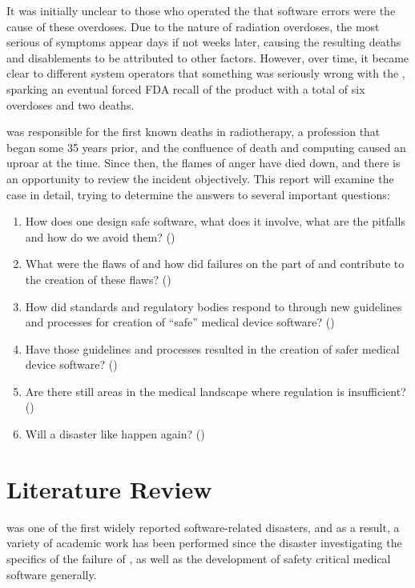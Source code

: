 \documentclass{cshonours}
\begin{document}
It was initially unclear to those who operated the \ther that software errors were the cause of these overdoses. Due to the nature of radiation overdoses, the most serious of symptoms appear days if not weeks later, causing the resulting deaths and disablements to be attributed to other factors. However, over time, it became clear to different system operators that something was seriously wrong with the \ther, sparking an eventual forced FDA recall of the product with a total of six overdoses and two deaths.

\ther was responsible for the first known deaths in radiotherapy, a profession that began some 35 years prior, and the confluence of death and computing caused an uproar at the time. Since then, the flames of anger have died down, and there is an opportunity to review the incident objectively. This report will examine the \ther case in detail, trying to determine the answers to several important questions:
\begin{enumerate}
 \item How does one design safe software, what does it involve, what are the pitfalls and how do we avoid them? ()
 \item What were the flaws of \ther and how did failures on the part of \aecl and \cgr contribute to the creation of these flaws? ()
 \item How did standards and regulatory bodies respond to \ther through new guidelines and processes for creation of ``safe'' medical device software? ()
 \item Have those guidelines and processes resulted in the creation of safer medical device software? () 
 \item Are there still areas in the medical landscape where regulation is insufficient? ()
 \item Will a disaster like \ther happen again? ()
\end{enumerate}


\chapter{Literature Review}
\label{chap:litreview}
\ther was one of the first widely reported software-related disasters, and as a result, a variety of academic work has been performed since the disaster investigating the specifics of the failure of \ther, as well as the development of safety critical  medical software generally.
\end{document}

